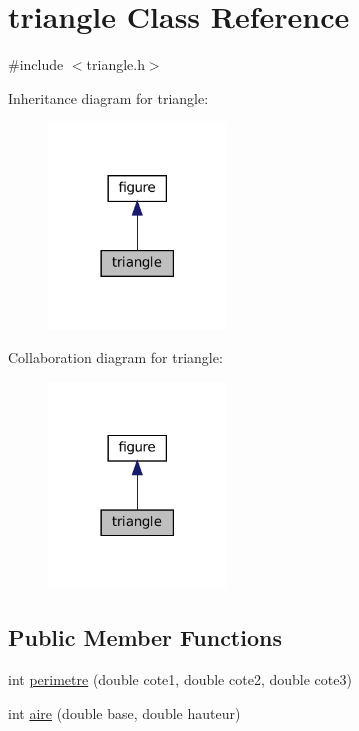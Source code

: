 \hypertarget{classtriangle}{}\section{triangle Class Reference}
\label{classtriangle}


{\ttfamily \#include $<$triangle.\+h$>$}



Inheritance diagram for triangle\+:
\nopagebreak
\begin{figure}[H]
\begin{center}
\leavevmode
\includegraphics[width=134pt]{classtriangle__inherit__graph}
\end{center}
\end{figure}


Collaboration diagram for triangle\+:
\nopagebreak
\begin{figure}[H]
\begin{center}
\leavevmode
\includegraphics[width=134pt]{classtriangle__coll__graph}
\end{center}
\end{figure}
\subsection*{Public Member Functions}
\begin{DoxyCompactItemize}
\item 
int \hyperlink{classtriangle_a82bfb1d9a931d224519e5970f0dc438f}{perimetre} (double cote1, double cote2, double cote3)
\item 
int \hyperlink{classtriangle_a8683b3301b318f00d2a097541d81c8a7}{aire} (double base, double hauteur)
\end{DoxyCompactItemize}



